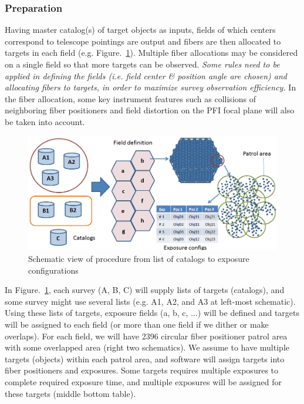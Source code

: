 \documentclass[a4paper,notitlepage]{article}
\begin{document}
\subsubsection{Preparation}

Having master catalog(s) of target objects as inputs, fields of which
centers correspond to telescope pointings are output and fibers are then
allocated to targets in each field
(e.g. Figure.~\ref{fig:sciops-scireq-slide-svyexp}). Multiple fiber
allocations may be considered on a single field so that more targets can
be observed. {\it Some rules need to be applied in defining the fields
(i.e. field center \& position angle are chosen) and allocating fibers
to targets, in order to maximize survey observation efficiency.}  In the
fiber allocation, some key instrument features such as collisions of
neighboring fiber positioners and field distortion on the PFI focal
plane will also be taken into account.

\begin{figure}[htb]
  \begin{center}
    \includegraphics[width=.75\linewidth]{sciops-scireq-slide-svyexp.png}
  \end{center}
  \caption{Schematic view of procedure from list of catalogs to exposure 
    configurations}
  \label{fig:sciops-scireq-slide-svyexp}
\end{figure}

In Figure.~\ref{fig:sciops-scireq-slide-svyexp}, 
each survey (A, B, C) will supply lists of targets (catalogs), 
and some survey might use several lists (e.g. A1, A2, and A3 at left-most 
schematic). 
Using these lists of targets, exposure fields (a, b, c, ...) will be defined 
and targets will be assigned to each field (or more than one field if we 
dither or make overlaps). 
For each field, we will have 2396 circular fiber positioner patrol area 
with some overlapped area (right two schematics). 
We assume to have multiple targets (objects) within each patrol area, 
and software will assign targets into fiber positioners and exposures. 
Some targets requires multiple exposures to complete required exposure time, 
and multiple exposures will be assigned for these targets
(middle bottom table). 
\end{document}
